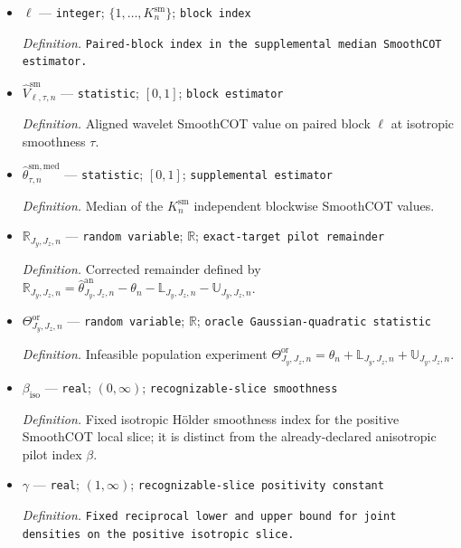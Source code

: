 \documentclass{article}
\begin{document}
\begin{itemize}
  \par\smallskip\noindent\emph{Definition.} SmoothCOT block size \(N_n^{\mathrm{sm}}=\lfloor n/K_n^{\mathrm{sm}}\rfloor\).
  \item \(\ell\) --- \texttt{integer}; \(\{1,\ldots,K_n^{\mathrm{sm}}\}\); \texttt{block index}
  \par\smallskip\noindent\emph{Definition.} \texttt{Paired-\allowbreak{}block index in the supplemental median SmoothCOT estimator.}
  \item \(\widehat V_{\ell,\tau,n}^{\mathrm{sm}}\) --- \texttt{statistic}; \([0,1]\); \texttt{block estimator}
  \par\smallskip\noindent\emph{Definition.} Aligned wavelet SmoothCOT value on paired block \(\ell\) at isotropic smoothness \(\tau\).
  \item \(\widehat\theta^{\mathrm{sm,med}}_{\tau,n}\) --- \texttt{statistic}; \([0,1]\); \texttt{supplemental estimator}
  \par\smallskip\noindent\emph{Definition.} Median of the \(K_n^{\mathrm{sm}}\) independent blockwise SmoothCOT values.
  \item \(\mathbb R_{J_y,J_z,n}\) --- \texttt{random variable}; \(\mathbb R\); \texttt{exact-\allowbreak{}target pilot remainder}
  \par\smallskip\noindent\emph{Definition.} Corrected remainder defined by \(\mathbb R_{J_y,J_z,n}=\widehat\theta^{\mathrm{an}}_{J_y,J_z,n}-\theta_n-\mathbb L_{J_y,J_z,n}-\mathbb U_{J_y,J_z,n}\).
  \item \(\Theta^{\mathrm{or}}_{J_y,J_z,n}\) --- \texttt{random variable}; \(\mathbb R\); \texttt{oracle Gaussian-\allowbreak{}quadratic statistic}
  \par\smallskip\noindent\emph{Definition.} Infeasible population experiment \(\Theta^{\mathrm{or}}_{J_y,J_z,n}=\theta_n+\mathbb L_{J_y,J_z,n}+\mathbb U_{J_y,J_z,n}\).
  \item \(\beta_{\mathrm{iso}}\) --- \texttt{real}; \((0,\infty)\); \texttt{recognizable-\allowbreak{}slice smoothness}
  \par\smallskip\noindent\emph{Definition.} Fixed isotropic H\"older smoothness index for the positive SmoothCOT local slice; it is distinct from the already-declared anisotropic pilot index \(\beta\).
  \item \(\gamma\) --- \texttt{real}; \((1,\infty)\); \texttt{recognizable-\allowbreak{}slice positivity constant}
  \par\smallskip\noindent\emph{Definition.} \texttt{Fixed reciprocal lower and upper bound for joint densities on the positive isotropic slice.}

\end{itemize}
\end{document}
